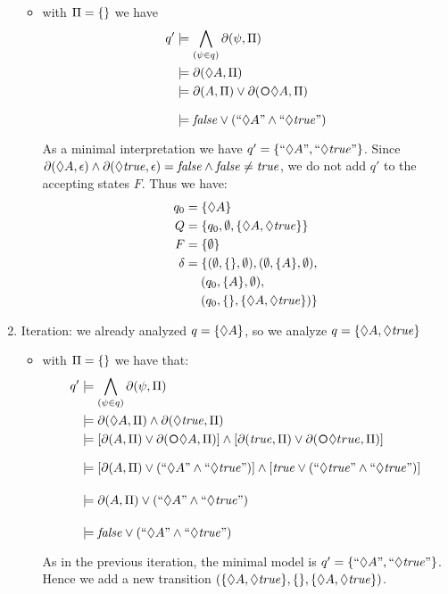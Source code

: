 \begin{example}
\begin{enumerate}
\begin{itemize}
			\item \label{exa:eventually-A_it-1_prop-empty} with $\Pi = \{\}$ we have 
			\begin{align*}
			q' &\models \bigwedge_{(\psi\in q)} \Dfun{\psi}\\
			&\models \Dfun{\Diamond A}\\
			&\models \Dfun{A} \lOR \Dfun{\Next \Diamond A}\\
			&\models \false \lOR (``\Diamond A" \lAND ``\Diamond \true")
			\end{align*}
			As a minimal interpretation we have $q' = \{``\Diamond A", ``\Diamond \mathit{true}"\}$. Since $\partial\lparen \Diamond A, \epsilon\rparen \wedge \partial\lparen \Diamond \mathit{true}, \epsilon\rparen = \mathit{false} \wedge \mathit{false} \neq \mathit{true}$, we do not add $q'$ to the accepting states $F$. Thus we have:
			\begin{align*}
			q_0 &= \{\Diamond A\}		\\
			Q &= \{q_0, \emptyset, \{\Diamond A, \Diamond \mathit{true}\}\}  \\
			F &= \{\emptyset\}  \\
			\delta &= \{(\emptyset, \{\}, \emptyset), (\emptyset, \{A\}, \emptyset),\\
				&\hspace*{.18in} (q_0, \{A\}, \emptyset),\\
				&\hspace*{.18in} (q_0, \{\}, \{\Diamond A, \Diamond \mathit{true}\})\}
			\end{align*}
		\end{itemize}
		
		\item \label{exa:eventually-A_it-2} Iteration: we already analyzed $q = \{\Diamond A\}$, so we analyze $q = \{\Diamond A, \Diamond \mathit{true}\}$
		\begin{itemize}			
			\item with $\Pi = \{\}$ we have that:
			\begin{align*}
			q' &\models \bigwedge_{(\psi\in q)} \Dfun{\psi}\\
			&\models \Dfun{\Diamond A} \lAND \Dfun{\Diamond \true}\\
			&\models [\Dfun{A} \lOR \Dfun{\Next \Diamond A}] \lAND [\Dfun{\true} \lOR \Dfun{\Next \Diamond true}]\\
			&\models [\Dfun{A} \lOR ( ``\Diamond A" \lAND ``\Diamond \true")] \lAND [\true \lOR ( ``\Diamond \true" \lAND ``\Diamond \true")]\\
			&\models \Dfun{A} \lOR ( ``\Diamond A" \lAND ``\Diamond \true")\\
			&\models \false \lOR ( ``\Diamond A" \lAND ``\Diamond \true")\\
			\end{align*}
			As in the previous iteration, the minimal model is $q' = \{``\Diamond A", ``\Diamond \mathit{true}"\}$. Hence we add a new transition $(\{\Diamond A, \Diamond \mathit{true}\}, \{\}, \{\Diamond A,  \Diamond \mathit{true}\})$.


\end{itemize}
\end{enumerate}
\end{example}
